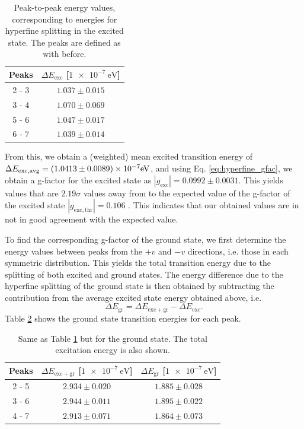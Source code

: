 \documentclass[a4paper]{report}
\numberwithin{equation}{section}
\begin{document}
\begin{table}[!ht]
    \centering
    \begin{tabular}{|c|c|}
    \hline
        Peaks & $\Delta E_\mathrm{exc}$ [$\SI{1e-7}{\electronvolt}$] \\ \hline
        2 - 3 & $1.037 \pm 0.015$ \\ \hline
        3 - 4 & $1.070 \pm 0.069$\\ \hline
        5 - 6 & $1.047 \pm 0.017$ \\ \hline
        6 - 7 & $1.039 \pm 0.014$ \\ \hline
    \end{tabular}
    \caption{Peak-to-peak energy values, corresponding to energies for hyperfine splitting in the excited state. The peaks are 
    defined as with before.}
    \label{tab:hyperfine_exc_en}
\end{table}

From this, we obtain a (weighted) mean excited transition energy of $\Delta E_\mathrm{exc, avg} = (1.0413 \pm 0.0089)\times 10^{-7} \si[]{\electronvolt}$, 
and using Eq. \ref{eq:hyperfine_gfac}, we obtain a g-factor for the excited state as $| g_\mathrm{exc} | = 0.0992 \pm 0.0031$.
This yields values that are $2.19\sigma$ values away from to the expected value of 
the g-factor of the excited state $| g_\mathrm{exc, thr} | = 0.106$ \cite{VANIN2007}. This indicates that our obtained 
values are in not in good agreement with the expected value.\par 

To find the corresponding g-factor of the ground state, we first determine the energy values between peaks from the $+v$ and $-v$
directions, i.e. those in each symmetric distribution. This yields the total transition energy due to the 
splitting of both excited and ground states. The energy difference due to the hyperfine splitting of the ground state is then obtained by 
subtracting the contribution from the average excited state energy obtained above, i.e.
\begin{equation}
    \Delta E_{\mathrm{gr}} = \Delta E_{\mathrm{exc + gr}} - \Delta E_{\mathrm{exc}} . 
\end{equation}
Table \ref{tab:hyperfine_gr_en} shows the ground state transition energies for each peak. 

\begin{table}[!ht]
    \centering
    \begin{tabular}{|c|c|c|}
    \hline
        Peaks & $\Delta E_\mathrm{exc + gr}$ [$\SI{1e-7}{\electronvolt}$] & $\Delta E_\mathrm{gr}$ [$\SI{1e-7}{\electronvolt}$]\\ \hline
        2 - 5 & $2.934 \pm 0.020$ & $1.885 \pm 0.028$\\ \hline
        3 - 6 & $2.944 \pm 0.011$ & $1.895 \pm 0.022$\\ \hline
        4 - 7 & $2.913 \pm 0.071$ & $1.864 \pm 0.073$\\ \hline
    \end{tabular}
    \caption{Same as Table \ref{tab:hyperfine_exc_en} but for the ground state. The total excitation energy is also shown.}
    \label{tab:hyperfine_gr_en}
\end{table}
\end{document}
